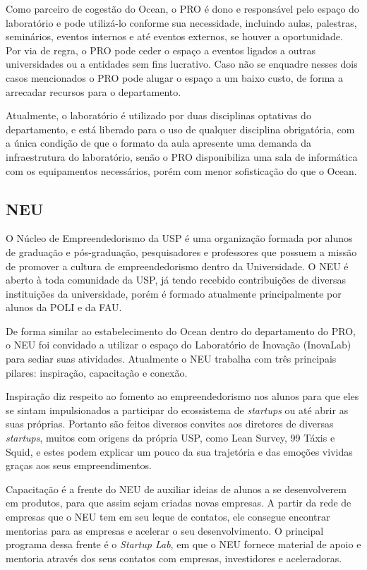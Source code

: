 Como parceiro de cogestão do Ocean, o PRO é dono e responsável pelo espaço do laboratório e pode utilizá-lo conforme sua necessidade, incluindo aulas, palestras, seminários, eventos internos e até eventos externos, se houver a oportunidade. Por via de regra, o PRO pode ceder o espaço a eventos ligados a outras universidades ou a entidades sem fins lucrativo. Caso não se enquadre nesses dois casos mencionados o PRO pode alugar o espaço a um baixo custo, de forma a arrecadar recursos para o departamento.

Atualmente, o laboratório é utilizado por duas disciplinas optativas do departamento, e está liberado para o uso de qualquer disciplina obrigatória, com a única condição de que o formato da aula apresente uma demanda da infraestrutura do laboratório, senão o PRO disponibiliza uma sala de informática com os equipamentos necessários, porém com menor sofisticação do que o Ocean.

\subsection{NEU}
\label{sec:con_neu}

O Núcleo de Empreendedorismo da USP é uma organização formada por alunos de graduação e pós-graduação, pesquisadores e professores que possuem a missão de promover a cultura de empreendedorismo dentro da Universidade. O NEU é aberto à toda comunidade da USP, já tendo recebido contribuições de diversas instituições da universidade, porém é formado atualmente principalmente por alunos da POLI e da FAU.

De forma similar ao estabelecimento do Ocean dentro do departamento do PRO, o NEU foi convidado a utilizar o espaço do Laboratório de Inovação (InovaLab) para sediar suas atividades. Atualmente o NEU trabalha com três principais pilares: inspiração, capacitação e conexão.

Inspiração diz respeito ao fomento ao empreendedorismo nos alunos para que eles se sintam impulsionados a participar do ecossistema de \textit{startups} ou até abrir as suas próprias. Portanto são feitos diversos convites aos diretores de diversas \textit{startups}, muitos com origens da própria USP, como Lean Survey, 99 Táxis e Squid, e estes podem explicar um pouco da sua trajetória e das emoções vividas graças aos seus empreendimentos. 

Capacitação é a frente do NEU de auxiliar ideias de alunos a se desenvolverem em produtos, para que assim sejam criadas novas empresas. A partir da rede de empresas que o NEU tem em seu leque de contatos, ele consegue encontrar mentorias para as empresas e acelerar o seu desenvolvimento. O principal programa dessa frente é o \textit{Startup Lab}, em que o NEU fornece material de apoio e mentoria através dos seus contatos com empresas, investidores e aceleradoras.

